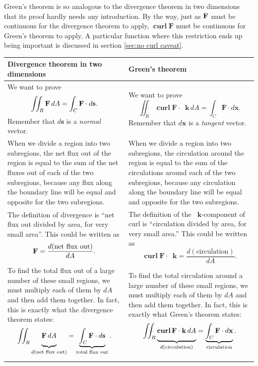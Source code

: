\documentclass{myarticle}
\let\div\relax %
\DeclareMathOperator{\div}{div}
\DeclareMathOperator{\curl}{\mathbf{curl}}
\renewcommand{\vec}[1]{\mathbf{#1}}
\newcommand{\unitvector}[1]{
  \mathop{}\!\vec{#1}
}
\newcommand{\kh}{\unitvector{k}}
\theoremstyle{nospace}
\newtheorem{old series theorem}{Theorem}
\newenvironment{series theorem}
{\begin{mdframed}\begin{old series theorem}}
    {\end{old series theorem}\end{mdframed}}
\begin{document}
Green's theorem is so analogous to the divergence theorem in two
dimensions that its proof hardly needs any introduction. By the way,
just as $\div \vec{F}$ must be continuous for the divergence theorem
to apply, $\curl \vec{F}$ must be continuous for Green's theorem to
apply. A particular function where this restriction ends up being
important is discussed in section \ref{sec:no curl caveat}.

\renewcommand{\arraystretch}{2}
\begin{longtable}{|P{0.47\textwidth}|P{0.47\textwidth}|}

  \hline

  Divergence theorem in two dimensions &
  Green's theorem \\

  \hline

  We want to prove
  \[
    \iint_R \div \vec{F} \,dA = \int_C \vec{F} \cdot d\vec{s}.
  \]
  Remember that $d\vec{s}$ is a \textit{normal} vector. &

  We want to prove
  \[
    \iint_R \curl \vec{F} \cdot \kh \,dA
    = \int_C \vec{F} \cdot d\vec{x}.
  \]
  Remember that $d\vec{x}$ is a \textit{tangent} vector. \\

  When we divide a region into two subregions, the net flux out of the
  region is equal to the sum of the net fluxes out of each of the two
  subregions, because any flux along the boundary line will be equal
  and opposite for the two subregions. &

  When we divide a region into two subregions, the circulation around
  the region is equal to the sum of the circulations around each of
  the two subregions, because any circulation along the boundary line
  will be equal and opposite for the two subregions. \\

  The definition of divergence is ``net flux out divided by area, for
  very small area''. This could be written as
  \[
    \div \vec{F} = \frac{d(\text{net flux out})}{dA}.
  \] &

  The definition of the $\kh$-component of curl is ``circulation
  divided by area, for very small area.'' This could be written as
  \[
    \curl \vec{F} \cdot \kh = \frac{d(\text{circulation})}{dA}.
  \] \\

  To find the total flux out of a large number of these small regions,
  we must multiply each of them by $dA$ and then add them together. In
  fact, this is exactly what the divergence theorem states:
  \[
    \iint_R \underbrace{\div \vec{F} \,dA
      \vphantom{\int}}_{d(\text{net flux out})}
    = \underbrace{\int_C \vec{F} \cdot d\vec{s}}
    _\text{total flux out}.
  \] &

  To find the total circulation around a large number of these small
  regions, we must multiply each of them by $dA$ and then add them
  together. In fact, this is exactly what Green's theorem states:
  \[
    \iint_R \underbrace{\curl \vec{F}
      \cdot \kh \,dA\vphantom{\int}}
    _{d(\text{circulation})}
    = \underbrace{\int_C \vec{F} \cdot d\vec{x}}
    _\text{circulation}.
  \] \\
  \hline
\end{longtable}
\end{document}
